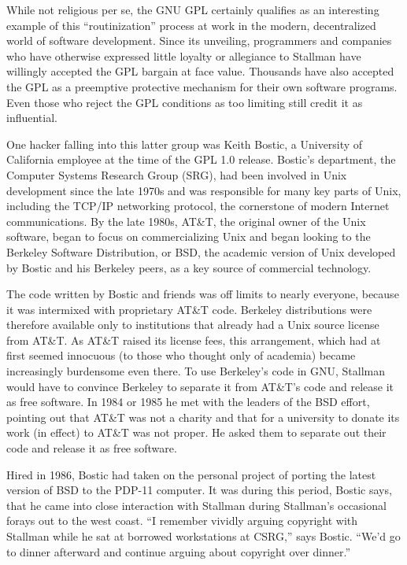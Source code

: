 While not religious per se, the GNU GPL certainly qualifies as an interesting example of this ``routinization'' process at work in the modern, decentralized world of software development. Since its unveiling, programmers and companies who have otherwise expressed little loyalty or allegiance to Stallman have willingly accepted the GPL bargain at face value. Thousands have also accepted the GPL as a preemptive protective mechanism for their own software programs. Even those who reject the GPL conditions as too limiting still credit it as influential.

One hacker falling into this latter group was Keith Bostic, a University of California employee at the time of the GPL 1.0 release. Bostic's department, the Computer Systems Research Group (SRG), had been involved in Unix development since the late 1970s and was responsible for many key parts of Unix, including the TCP/IP networking protocol, the cornerstone of modern Internet communications. By the late 1980s, AT\&T, the original owner of the Unix software, began to focus on commercializing Unix and began looking to the Berkeley Software Distribution, or BSD, the academic version of Unix developed by Bostic and his Berkeley peers, as a key source of commercial technology.

The code written by Bostic and friends was off limits to nearly everyone, because it was intermixed with proprietary AT\&T code. Berkeley distributions were therefore available only to institutions that already had a Unix source license from AT\&T. As AT\&T raised its license fees, this arrangement, which had at first seemed innocuous (to those who thought only of academia) became increasingly burdensome even there.  To use Berkeley's code in GNU, Stallman would have to convince Berkeley to separate it from AT\&T's code and release it as free software.  In 1984 or 1985 he met with the leaders of the BSD effort, pointing out that AT\&T was not a charity and that for a university to donate its work (in effect) to AT\&T was not proper.  He asked them to separate out their code and release it as free software.

Hired in 1986, Bostic had taken on the personal project of porting the latest version of BSD to the PDP-11 computer. It was during this period, Bostic says, that he came into close interaction with Stallman during Stallman's occasional forays out to the west coast. ``I remember vividly arguing copyright with Stallman while he sat at borrowed workstations at CSRG,'' says Bostic. ``We'd go to dinner afterward and continue arguing about copyright over dinner.''

